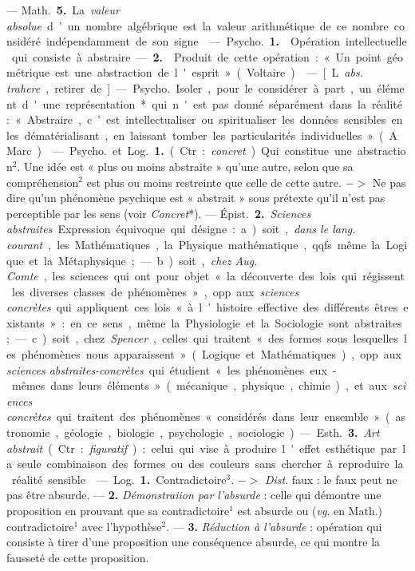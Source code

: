 \begin{itemize}[leftmargin=1cm, label=, itemsep=1pt]
 — \si{Math.} {\bf 5.} La {\it valeur absolue} d’un
nombre algébrique est la valeur
arithmétique de ce nombre considéré
indépendamment de son signe.

 — \si{Psycho.} {\bf 1.}  Opération
intellectuelle qui consiste à
abstraire. — {\bf 2.}  Produit de cette
opération : « Un point géométrique est
une abstraction de l'esprit » (Voltaire).

 — [L. {\it abs. trahere}, retirer de]
— \si{Psycho.} Isoler, pour le considérer
à part, un élément d'une représentation*
qui n'est pas donné séparément
dans la réalité : « Abstraire,
c’est intellectualiser ou spiritualiser
les données sensibles en les dématérialisant,
en laissant tomber les
particularités individuelles » (A.
Marc).

 — \si{Psycho.} et \si{Log.} {\bf 1.} (Ctr. :
{\it concret}). Qui constitue une abstraction$^2$.
Une idée est « plus ou moins
abstraite » qu'une autre, selon que
sa compréhension$^2$ est plus ou
moins restreinte que celle de cette
autre. $->$ Ne pas dire qu’un phénomène
psychique est « abstrait »
sous prétexte qu'il n’est pas perceptible
par les sens (voir {\it Concret}*). —
\si{Épist.} {\bf 2.} {\it Sciences abstraites}. Expression
équivoque qui désigne : a) soit,
{\it dans le lang. courant}, les Mathématiques,
la Physique mathématique,
qqfs. même la Logique et la Métaphysique;
— b) soit, {\it chez Aug.
Comte}, les sciences qui ont pour
objet « la découverte des lois qui
régissent les diverses classes de phénomènes »,
opp. aux {\it sciences concrètes}
qui appliquent ces lois « à l’histoire
effective des différents êtres existants » :
en ce sens, même la Physiologie
et la Sociologie sont abstraites;
— c) soit, chez {\it Spencer}, celles qui
traitent « des formes sous lesquelles
les phénomènes nous apparaissent »
(Logique et Mathématiques), opp.
aux {\it sciences abstraites-concrètes} qui
étudient « les phénomènes eux-mêmes
dans leurs éléments » (mécanique,
physique, chimie), et aux
{\it sciences concrètes} qui traitent des
phénomènes « considérés dans leur
ensemble » (astronomie, géologie,
biologie, psychologie, sociologie).

— \si{Esth.} {\bf 3.} {\it Art abstrait} (Ctr : {\it figuratif}) : celui qui vise à produire
l'effet esthétique par la seule combinaison des formes ou des couleurs
sans chercher à reproduire la réalité
sensible.

 — \si{Log.} {\bf 1.} Contradictoire$^3$.
$->$ {\it Dist}. faux : le faux peut ne pas
être absurde. — {\bf 2.} {\it Démonstraiion
par l'absurde} : celle qui démontre
une proposition en prouvant que sa
contradictoire$^1$ est absurde ou ({\it vg}.
en Math.) contradictoire$^1$ avec l’hypothèse$^2$. — {\bf 3.} {\it Réduction à l'absurde} :
opération qui consiste à tirer d’une
proposition une conséquence absurde,
ce qui montre la fausseté de cette
proposition.


\end{itemize}
